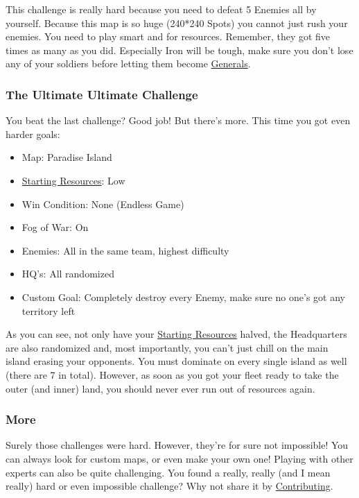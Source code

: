\documentclass[12pt]{article}
\begin{document}
This challenge is really hard because you need to defeat 5 Enemies all by yourself. Because this map is so huge (240*240 Spots) you cannot just rush your enemies. You need to play smart and for resources. Remember, they got five times as many as you did. Especially Iron will be tough, make sure you don't lose any of your soldiers before letting them become \hyperref[sec:general]{Generals}.

\subsubsection{The Ultimate Ultimate Challenge}
\label{sec:challenge_ultimate_ultimate}

You beat the last challenge? Good job! But there's more. This time you got even harder goals:

\begin{itemize}
  \item Map: Paradise Island
  \item \hyperref[sec:startingresources]{Starting Resources}: Low
  \item Win Condition: None (Endless Game)
  \item Fog of War: On
  \item Enemies: All in the same team, highest difficulty
  \item HQ's: All randomized
  \item Custom Goal: Completely destroy every Enemy, make sure no one's got any territory left
\end{itemize}

As you can see, not only have your \hyperref[sec:startingresources]{Starting Resources} halved, the Headquarters are also randomized and, most importantly, you can't just chill on the main island erasing your opponents. You must dominate on every single island as well (there are 7 in total). However, as soon as you got your fleet ready to take the outer (and inner) land, you should never ever run out of resources again.

\subsubsection{More}
\label{sec:challenge_more}

Surely those challenges were hard. However, they're for sure not impossible! You can always look for custom maps, or even make your own one! Playing with other experts can also be quite challenging. You found a really, really (and I mean really) hard or even impossible challenge? Why not share it by \hyperref[sec:contributing]{Contributing}.
\end{document}
